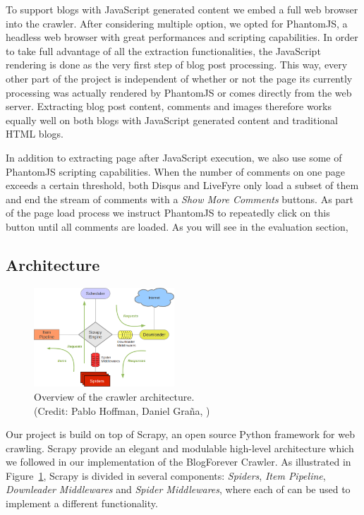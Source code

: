 To support blogs with JavaScript generated content we embed a full web browser into the crawler. After considering multiple option, we opted for PhantomJS\cite{phantomjs2013}, a headless web browser with great performances and scripting capabilities. In order to take full advantage of all the extraction functionalities, the JavaScript rendering is done as the very first step of blog post processing. This way, every other part of the project is independent of whether or not the page its currently processing was actually rendered by PhantomJS or comes directly from the web server. Extracting blog post content, comments and images therefore works equally well on both blogs with JavaScript generated content and traditional HTML blogs.

In addition to extracting page after JavaScript execution, we also use some of PhantomJS scripting capabilities. When the number of comments on one page exceeds a certain threshold, both Disqus and LiveFyre only load a subset of them and end the stream of comments with a \emph{Show More Comments} buttons. As part of the page load process we instruct PhantomJS to repeatedly click on this button until all comments are loaded. As you will see in the evaluation section, 


\subsection{Architecture}

\begin{figure}
  \capstart
  \centering
  \includegraphics[width=0.47\textwidth]{img/scrapy_architecture.png}
  \caption{Overview of the crawler architecture.\\\small{(Credit: Pablo Hoffman, Daniel Graña, \cite{scrapy2013})}}
  \label{architecture}
\end{figure}

Our project is build on top of Scrapy\cite{scrapy2013}, an open source Python framework for web crawling. Scrapy provide an elegant and modulable high-level architecture which we followed in our implementation of the BlogForever Crawler. As illustrated in Figure~\ref{architecture}, Scrapy is divided in several components: \emph{Spiders}, \emph{Item Pipeline}, \emph{Downleader Middlewares} and \emph{Spider Middlewares}, where each of can be used to implement a different functionality.

